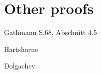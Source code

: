 \section{Other proofs}

\begin{todo}
\item Gathmann S.68, Abschnitt 4.5
\item Hartshorne
\item Dolgachev
\end{todo}
